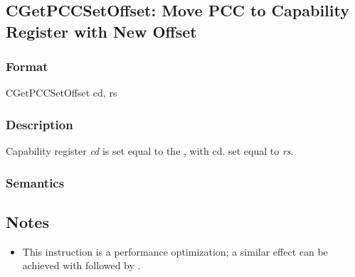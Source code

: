 \clearpage
{}
{}
\subsection*{CGetPCCSetOffset: Move PCC to Capability Register with New Offset}

\subsubsection*{Format}

CGetPCCSetOffset cd, rs


\begin{center}
\end{center}

\subsubsection*{Description}

Capability register \emph{cd} is set equal to the \PCC{}, with
cd.\coffset{} set equal to \emph{rs}.

\subsubsection*{Semantics}


\subsection*{Notes}

\begin{itemize}
\item
This instruction is a performance optimization; a similar effect can be
achieved with  followed by .
\end{itemize}

